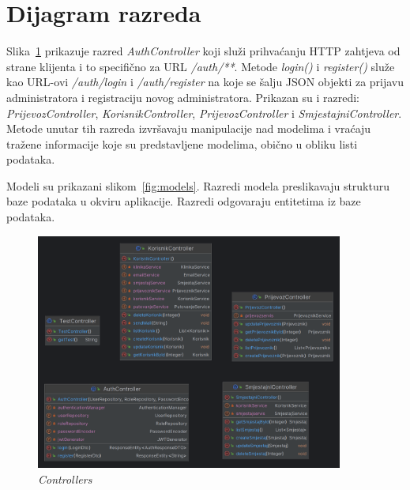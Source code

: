 			
			\eject
			
			
		\section{Dijagram razreda}
		
			
			Slika~\ref{fig:controllers} prikazuje razred \textit{AuthController} koji služi prihvaćanju HTTP zahtjeva od strane klijenta i to specifično za URL \textit{/auth/**}. Metode \textit{login()} i \textit{register()} služe kao URL-ovi \textit{/auth/login} i \textit{/auth/register} na koje se šalju JSON objekti za prijavu administratora i registraciju novog administratora. Prikazan su i razredi: \textit{PrijevozController}, \textit{KorisnikController},  \textit{PrijevozController} i \textit{SmjestajniController}. Metode unutar tih razreda izvršavaju manipulacije nad modelima i vraćaju tražene informacije koje su predstavljene modelima, obično u obliku listi podataka. 
			
			Modeli su prikazani slikom~\ref{fig:models}. Razredi modela preslikavaju strukturu baze podataka u okviru aplikacije. Razredi odgovaraju entitetima iz baze podataka.
			
			\begin{figure}[htbp]
				\centering
				\includegraphics[width=0.9\textwidth]{slike/controllers}
				\caption{\textit{Controllers}}
				\label{fig:controllers}
			\end{figure}
			
